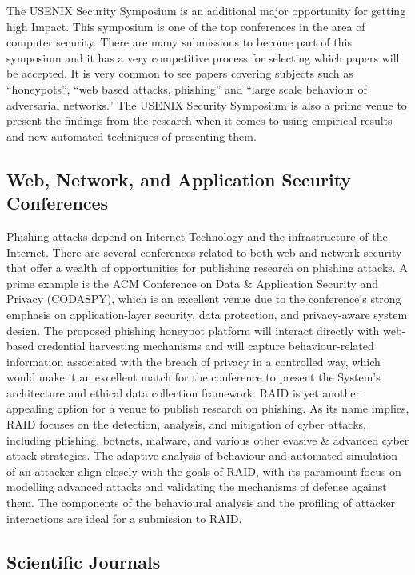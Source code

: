The USENIX Security Symposium is an additional major opportunity for getting high Impact. This symposium is one of the top conferences in the area of computer security. There are many submissions to become part of this symposium and it has a very competitive process for selecting which papers will be accepted. It is very common to see papers covering subjects such as “honeypots”, “web based attacks, phishing” and “large scale behaviour of adversarial networks.” The USENIX Security Symposium is also a prime venue to present the findings from the research when it comes to using empirical results and new automated techniques of presenting them.

\subsection{Web, Network, and Application Security Conferences}

Phishing attacks depend on Internet Technology and the infrastructure of the Internet. There are several conferences related to both web and network security that offer a wealth of opportunities for publishing research on phishing attacks. A prime example is the ACM Conference on Data \& Application Security and Privacy (CODASPY), which is an excellent venue due to the conference's strong emphasis on application-layer security, data protection, and privacy-aware system design. The proposed phishing honeypot platform will interact directly with web-based credential harvesting mechanisms and will capture behaviour-related information associated with the breach of privacy in a controlled way, which would make it an excellent match for the conference to present the System's architecture and ethical data collection framework. RAID is yet another appealing option for a venue to publish research on phishing. As its name implies, RAID focuses on the detection, analysis, and mitigation of cyber attacks, including phishing, botnets, malware, and various other evasive \& advanced cyber attack strategies. The adaptive analysis of behaviour and automated simulation of an attacker align closely with the goals of RAID, with its paramount focus on modelling advanced attacks and validating the mechanisms of defense against them. The components of the behavioural analysis and the profiling of attacker interactions are ideal for a submission to RAID.


\subsection{Scientific Journals}

